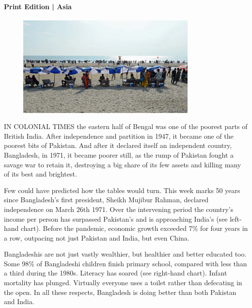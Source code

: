 \documentclass{article}
\begin{document}
\paragraph{Print Edition | Asia  \quad \color{gray}{Mar 25th 2021 }}
\begin{figure}[h]
\centering
\includegraphics[width=0.8\textwidth]{images/20210327_ASP003_1.jpg}
\end{figure}
\lettrine{I}N COLONIAL TIMES the eastern half of Bengal was one of the poorest parts of British India. After independence and partition in 1947, it became one of the poorest bits of Pakistan. And after it declared itself an independent country, Bangladesh, in 1971, it became poorer still, as the rump of Pakistan fought a savage war to retain it, destroying a big share of its few assets and killing many of its best and brightest. 

Few could have predicted how the tables would turn. This week marks 50 years since Bangladesh's first president, Sheikh Mujibur Rahman, declared independence on March 26th 1971. Over the intervening period the country's income per person has surpassed Pakistan's and is approaching India's (see left-hand chart). Before the pandemic, economic growth exceeded 7\% for four years in a row, outpacing not just Pakistan and India, but even China. 

Bangladeshis are not just vastly wealthier, but healthier and better educated too. Some 98\% of Bangladeshi children finish primary school, compared with less than a third during the 1980s. Literacy has soared (see right-hand chart). Infant mortality has plunged. Virtually everyone uses a toilet rather than defecating in the open. In all these respects, Bangladesh is doing better than both Pakistan and India. 
\end{document}
